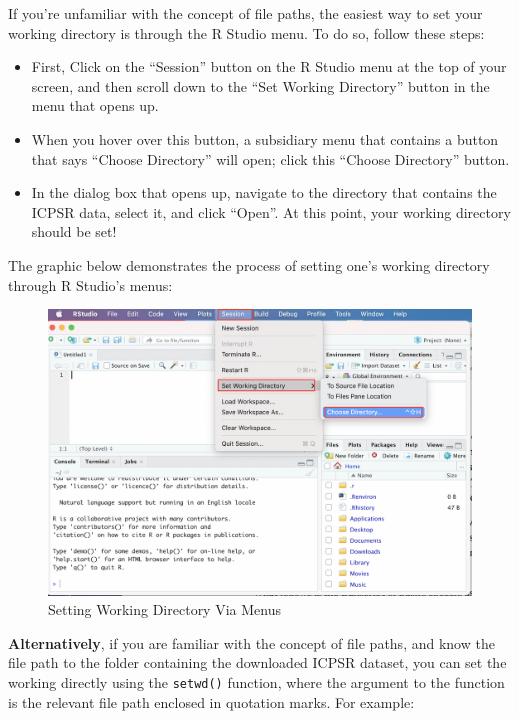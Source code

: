 \documentclass[
]{article}
\providecommand{\tightlist}{%
  \setlength{\itemsep}{0pt}\setlength{\parskip}{0pt}}
\begin{document}
If you're unfamiliar with the concept of file paths, the easiest way to set your working directory is through the R Studio menu. To do so, follow these steps:

\begin{itemize}
\tightlist
\item
  First, Click on the ``Session'' button on the R Studio menu at the top of your screen, and then scroll down to the ``Set Working Directory'' button in the menu that opens up.
\item
  When you hover over this button, a subsidiary menu that contains a button that says ``Choose Directory'' will open; click this ``Choose Directory'' button.
\item
  In the dialog box that opens up, navigate to the directory that contains the ICPSR data, select it, and click ``Open''. At this point, your working directory should be set!
\end{itemize}

The graphic below demonstrates the process of setting one's working directory through R Studio's menus:

\begin{figure}
\includegraphics[width=1\linewidth]{images/setting_wd_revised} \caption{Setting Working Directory Via Menus}\label{fig:unnamed-chunk-7}
\end{figure}

\textbf{Alternatively}, if you are familiar with the concept of file paths, and know the file path to the folder containing the downloaded ICPSR dataset, you can set the working directly using the \texttt{setwd()} function, where the argument to the function is the relevant file path enclosed in quotation marks. For example:
\end{document}
